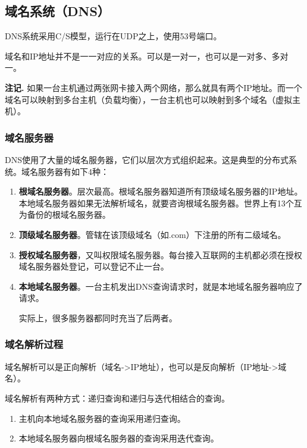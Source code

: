 \documentclass[12pt, a4paper, oneside]{ctexart}
\newenvironment{note}{\par\noindent\textbf{注记. }}{\par}
\begin{document}
\subsection{域名系统（DNS）}

DNS系统采用C/S模型，运行在UDP之上，使用53号端口。

域名和IP地址并不是一一对应的关系。可以是一对一，也可以是一对多、多对一。

\begin{note}
    如果一台主机通过两张网卡接入两个网络，那么就具有两个IP地址。而一个域名可以映射到多台主机（负载均衡），一台主机也可以映射到多个域名（虚拟主机）。
\end{note}

\subsubsection{域名服务器}

DNS使用了大量的域名服务器，它们以层次方式组织起来。这是典型的分布式系统。域名服务器有如下4种：
\begin{enumerate}
    \item {\bf 根域名服务器}。层次最高。根域名服务器知道所有顶级域名服务器的IP地址。本地域名服务器如果无法解析域名，就要咨询根域名服务器。世界上有13个互为备份的根域名服务器。
    \item {\bf 顶级域名服务器}。管辖在该顶级域名（如.com）下注册的所有二级域名。
    \item {\bf 授权域名服务器}，又叫权限域名服务器。每台接入互联网的主机都必须在授权域名服务器处登记，可以登记不止一台。
    \item {\bf 本地域名服务器}。一台主机发出DNS查询请求时，就是本地域名服务器响应了请求。
    
    实际上，很多服务器都同时充当了后两者。
\end{enumerate}

\subsubsection{域名解析过程}

域名解析可以是正向解析（域名->IP地址），也可以是反向解析（IP地址->域名）。

域名解析有两种方式：递归查询和递归与迭代相结合的查询。
\begin{enumerate}
    \item 主机向本地域名服务器的查询采用递归查询。
    \item 本地域名服务器向根域名服务器的查询采用迭代查询。
\end{enumerate}
\end{document}
